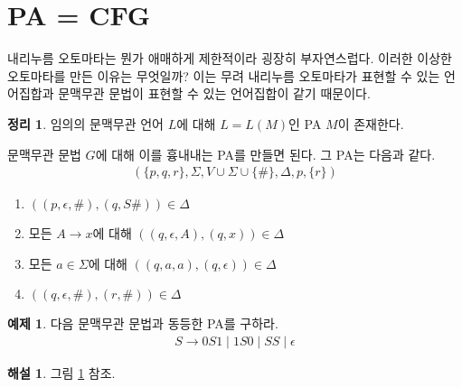 \documentclass[b5paper, 11pt]{book}
\theoremstyle{definition}
\newtheorem{thm}[defn]{정리}
\newtheorem{ex}[defn]{예제}
\newtheorem*{ans*}{해설}
\newenvironment{pf*}{\pushQED{\qed}\pf}
{\popQED\endpf}
\begin{document}
\section{PA = CFG}
내리누름 오토마타는 뭔가 애매하게 제한적이라 굉장히 부자연스럽다. 이러한 이상한 오토마타를 만든 이유는 무엇일까? 이는 무려 내리누름 오토마타가 표현할 수 있는 언어집합과 문맥무관 문법이 표현할 수 있는 언어집합이 같기 때문이다.
\begin{thm}
임의의 문맥무관 언어 $L$에 대해 $L = L(M)$인 PA $M$이 존재한다.
\end{thm}
\begin{pf*}
문맥무관 문법 $G$에 대해 이를 흉내내는 PA를 만들면 된다. 그 PA는 다음과 같다. 
\begin{align*}
    (\{p,q,r\}, \Sigma, V \cup \Sigma \cup \{\#\}, \Delta, p, \{r\})
\end{align*}
\begin{enumerate}
    \item $((p,\epsilon, \#), (q, S\#)) \in \Delta$
    \item 모든 $A \rightarrow x$에 대해 $((q, \epsilon, A), (q, x)) \in \Delta$
    \item 모든 $a \in \Sigma$에 대해 $((q, a, a) , (q, \epsilon)) \in \Delta$
    \item $((q, \epsilon, \#), (r, \#)) \in \Delta$
\end{enumerate}

\end{pf*}
\begin{ex}
다음 문맥무관 문법과 동등한 PA를 구하라. 
\begin{align*}
    S \rightarrow 0S1 \;\vert\; 1S0 \;\vert\; SS \;\vert\; \epsilon
\end{align*}
\end{ex}
\begin{ans*}
    그림 \ref{cfg=pa} 참조.
    \begin{figure}[!ht]
        \centering
        \caption{} 
        \label{cfg=pa}
    \end{figure}
\end{ans*}
\end{document}
